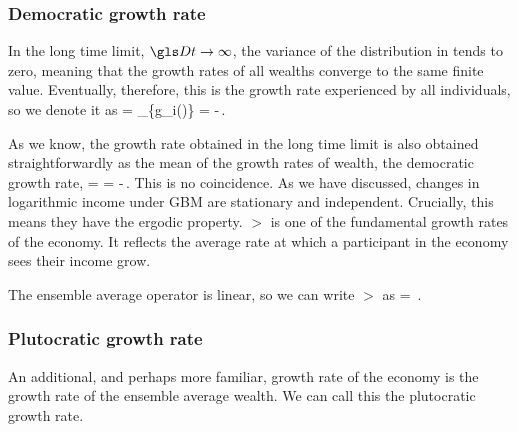 \subsubsection{Democratic growth rate}
In the long time limit, $\Dt\to\infty$, the variance of the distribution in  tends to zero, meaning that the growth rates of all wealths converge to the same finite value. Eventually, therefore, this is the growth rate experienced by all individuals, so we denote it as
\be
\gt = \lim_{\Dt\to\infty}\left\{g_i(\Dt)\right\} = \gmu-\,.
\ee

As we know, the growth rate obtained in the long time limit is also obtained straightforwardly as the mean of the growth rates of wealth, the democratic growth rate, \ie
\be
\gt = \ave{\g(\Dt)} = \gmu-\,.
\ee
This is no coincidence. As we have discussed, changes in logarithmic income under GBM are stationary and independent. Crucially, this means they have the ergodic property. $\gt$ is one of the fundamental growth rates of the economy. It reflects the average rate at which a participant in the economy sees their income grow.

The ensemble average operator is linear, so we can write $\gt$ as
\be
\gt = \,.
\ee


\subsubsection{Plutocratic growth rate}
An additional, and perhaps more familiar, growth rate of the economy is the growth rate of the ensemble average wealth. We can call this the plutocratic growth rate.

